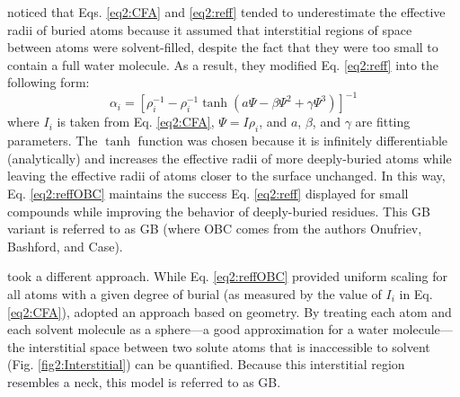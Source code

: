 \citeauthor{Onufriev_Proteins_2004_v55_p383} noticed that Eqs. \ref{eq2:CFA} and
\ref{eq2:reff} tended to underestimate the effective radii of buried atoms
because it assumed that interstitial regions of space between atoms were
solvent-filled, despite the fact that they were too small to contain a full
water molecule. \cite{Onufriev_Proteins_2004_v55_p383} As a result, they
modified Eq. \ref{eq2:reff} into the following form:
\begin{equation}
   \alpha _ i = \left[ \rho _ i ^ {-1} - \rho _ i ^ {-1} \tanh \left( a
   \Psi - \beta \Psi^2 + \gamma \Psi^3 \right) \right] ^ {-1}
   \label{eq2:reffOBC}
\end{equation}
where $I_i$ is taken from Eq. \ref{eq2:CFA}, $\Psi = I \rho_i$, and $a$,
$\beta$, and $\gamma$ are fitting parameters. The $\tanh$ function was chosen
because it is infinitely differentiable (analytically) and increases the
effective radii of more deeply-buried atoms while leaving the effective radii of
atoms closer to the surface unchanged. In this way, Eq. \ref{eq2:reffOBC}
maintains the success Eq. \ref{eq2:reff} displayed for small compounds while
improving the behavior of deeply-buried residues.
\cite{Onufriev_Proteins_2004_v55_p383} This GB variant is referred to as
GB (where OBC comes from the authors Onufriev, Bashford, and Case).

\citeauthor{Mongan_JChemTheoryComput_2007_v3_p156} took a different approach.
While Eq. \ref{eq2:reffOBC} provided uniform scaling for all atoms with a given
degree of burial (as measured by the value of $I_i$ in Eq. \ref{eq2:CFA}),
\citeauthor{Mongan_JChemTheoryComput_2007_v3_p156} adopted an approach based on
geometry. By treating each atom and each solvent molecule as a sphere---a good
approximation for a water molecule---the interstitial space between two solute
atoms that is inaccessible to solvent (Fig. \ref{fig2:Interstitial}) can be
quantified. Because this interstitial region resembles a neck, this model is
referred to as GB. \cite{Mongan_JChemTheoryComput_2007_v3_p156}

